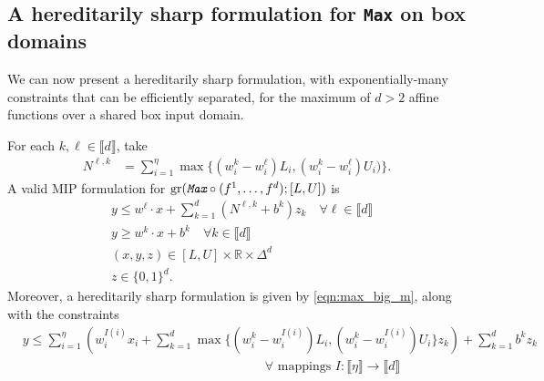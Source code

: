 \documentclass[smallextended]{svjour3}
\newcommand{\gr}{\operatorname{gr}}
\newcommand{\Max}{\texttt{Max}}
\begin{document}
\subsection{A hereditarily sharp formulation for \Max{} on box domains} \label{ssec:max-cuts}

We can now present a hereditarily sharp formulation, with exponentially-many constraints that can be efficiently separated, for the maximum of $d > 2$ affine functions over a shared box input domain. %
\begin{proposition}\label{prop:max_sharp}
    For each $k, \ell \in \llbracket d \rrbracket$, take
    \begin{align*}
        N^{\ell,k} &= \sum_{i=1}^\eta \max\{(w^k_i-w^\ell_i)L_i, (w^k_i-w^\ell_i)U_i)\}.
    \end{align*}
    A valid MIP formulation for $\gr(\emph{\Max{}} \circ (f^1,\ldots,f^d); [L,U])$ is
    \begin{subequations} \label{eqn:max_big_m}
    \begin{align}
    &y \leq w^\ell \cdot x + \sum_{k=1}^d \left(N^{\ell,k} + b^k\right)z_k \quad \forall \ell \in \llbracket d \rrbracket \label{eqn:max_big_m-1} \\
   &y \geq w^k \cdot x + b^k \quad\forall k \in \llbracket d \rrbracket \label{eqn:max_d_box-2} \\
    &(x,y,z) \in [L,U] \times \mathbb{R} \times \Delta^d \label{eqn:max_d_box-3}\\
    &z \in \{0,1\}^d.
    \end{align}
    \end{subequations}
    Moreover, a hereditarily sharp formulation is given by \eqref{eqn:max_big_m}, along with the constraints
\begin{align}
&y \leq \sum_{i=1}^{\eta}\left(w^{I(i)}_ix_i+\sum_{k=1}^d\max\{(w^{k}_i-w^{I(i)}_i)L_i,(w^{k}_i-w^{I(i)}_i)U_i\}z_k\right)+\sum_{k=1}^db^kz_k\nonumber\\ &\hspace{19em}\forall \text{ mappings } I : \llbracket \eta \rrbracket \to \llbracket d \rrbracket \label{eqn:max_d_box-1}
\end{align}

\end{proposition}
\end{document}
